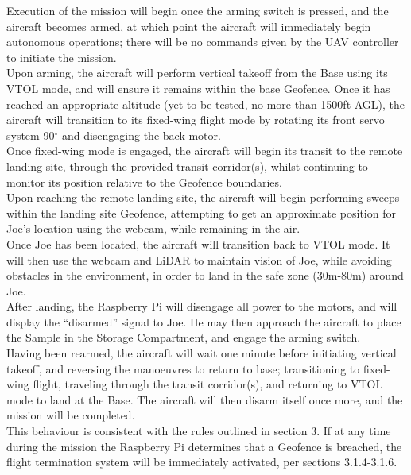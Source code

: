 Execution of the mission will begin once the arming switch is pressed, and the aircraft becomes armed, at which point the aircraft will immediately begin autonomous operations; there will be no commands given by the UAV controller to initiate the mission.\\

Upon arming, the aircraft will perform vertical takeoff from the Base using its VTOL mode, and will ensure it remains within the base Geofence. Once it has reached an appropriate altitude (yet to be tested, no more than 1500ft AGL), the aircraft will transition to its fixed-wing flight mode by rotating its front servo system 90$^\circ$ and disengaging the back motor.\\

Once fixed-wing mode is engaged, the aircraft will begin its transit to the remote landing site, through the provided transit corridor(s), whilst continuing to monitor its position relative to the Geofence boundaries.\\

Upon reaching the remote landing site, the aircraft will begin performing sweeps within the landing site Geofence, attempting to get an approximate position for Joe's location using the webcam, while remaining in the air.\\

Once Joe has been located, the aircraft will transition back to VTOL mode. It will then use the webcam and LiDAR to maintain vision of Joe, while avoiding obstacles in the environment, in order to land in the safe zone (30m-80m) around Joe.\\

After landing, the Raspberry Pi will disengage all power to the motors, and will display the ``disarmed'' signal to Joe. He may then approach the aircraft to place the Sample in the Storage Compartment, and engage the arming switch.\\

Having been rearmed, the aircraft will wait one minute before initiating vertical takeoff, and reversing the manoeuvres to return to base; transitioning to fixed-wing flight, traveling through the transit corridor(s), and returning to VTOL mode to land at the Base. The aircraft will then disarm itself once more, and the mission will be completed.\\

This behaviour is consistent with the rules outlined in section 3. If at any time during the mission the Raspberry Pi determines that a Geofence is breached, the flight termination system will be immediately activated, per sections 3.1.4-3.1.6.

